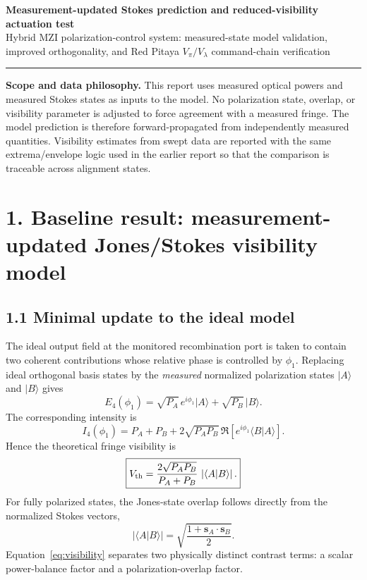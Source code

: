 \documentclass[10pt]{article}
\newcommand{\vect}[1]{\bm{#1}}
\begin{document}
{\Large\bfseries Measurement-updated Stokes prediction and reduced-visibility actuation test}\\[-1pt]
{\small Hybrid MZI polarization-control system: measured-state model validation, improved orthogonality, and Red Pitaya $V_\pi/V_\lambda$ command-chain verification}

\vspace{4pt}
\hrule
\vspace{6pt}

\begin{tcolorbox}[colback=light,colframe=navy,boxrule=0.6pt,arc=1.5pt,left=6pt,right=6pt,top=5pt,bottom=5pt]
\textbf{Scope and data philosophy.} This report uses measured optical powers and measured Stokes states as inputs to the model. No polarization state, overlap, or visibility parameter is adjusted to force agreement with a measured fringe. The model prediction is therefore forward-propagated from independently measured quantities. Visibility estimates from swept data are reported with the same extrema/envelope logic used in the earlier report so that the comparison is traceable across alignment states.
\end{tcolorbox}

\section*{1. Baseline result: measurement-updated Jones/Stokes visibility model}

\subsection*{1.1 Minimal update to the ideal model}
The ideal output field at the monitored recombination port is taken to contain two coherent contributions whose relative phase is controlled by $\phi_1$. Replacing ideal orthogonal basis states by the \emph{measured} normalized polarization states $\lvert A\rangle$ and $\lvert B\rangle$ gives
\begin{equation}
E_4(\phi_1)=\sqrt{P_A}\,e^{i\phi_1}\lvert A\rangle+\sqrt{P_B}\,\lvert B\rangle .
\end{equation}
The corresponding intensity is
\begin{equation}
I_4(\phi_1)=P_A+P_B+2\sqrt{P_AP_B}\,\Re\!\left[e^{i\phi_1}\langle B\vert A\rangle\right].
\end{equation}
Hence the theoretical fringe visibility is
\begin{equation}
\boxed{V_{\rm th}=\frac{2\sqrt{P_AP_B}}{P_A+P_B}\,\left|\langle A\vert B\rangle\right|.}
\label{eq:visibility}
\end{equation}
For fully polarized states, the Jones-state overlap follows directly from the normalized Stokes vectors,
\begin{equation}
\boxed{\left|\langle A\vert B\rangle\right|=
\sqrt{\frac{1+\vect{s}_A\!\cdot\!\vect{s}_B}{2}}.}
\label{eq:stokesoverlap}
\end{equation}
Equation~\eqref{eq:visibility} separates two physically distinct contrast terms: a scalar power-balance factor and a polarization-overlap factor.
\end{document}
